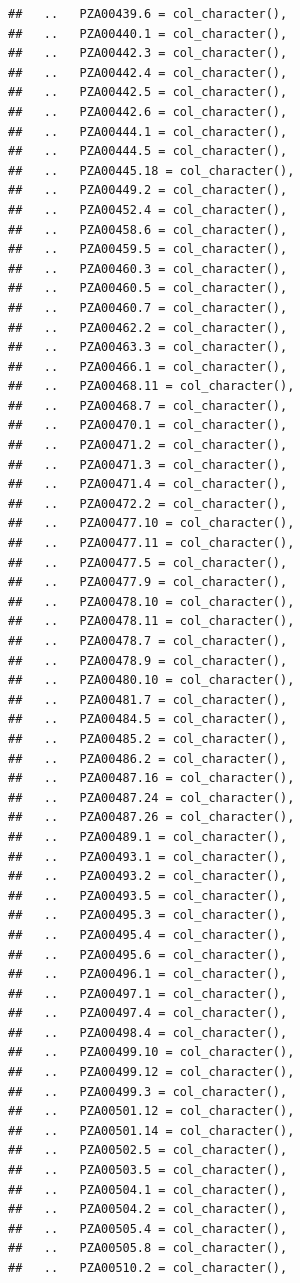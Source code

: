 \documentclass[
]{article}
\begin{document}
\begin{verbatim}
##   ..   PZA00439.6 = col_character(),
##   ..   PZA00440.1 = col_character(),
##   ..   PZA00442.3 = col_character(),
##   ..   PZA00442.4 = col_character(),
##   ..   PZA00442.5 = col_character(),
##   ..   PZA00442.6 = col_character(),
##   ..   PZA00444.1 = col_character(),
##   ..   PZA00444.5 = col_character(),
##   ..   PZA00445.18 = col_character(),
##   ..   PZA00449.2 = col_character(),
##   ..   PZA00452.4 = col_character(),
##   ..   PZA00458.6 = col_character(),
##   ..   PZA00459.5 = col_character(),
##   ..   PZA00460.3 = col_character(),
##   ..   PZA00460.5 = col_character(),
##   ..   PZA00460.7 = col_character(),
##   ..   PZA00462.2 = col_character(),
##   ..   PZA00463.3 = col_character(),
##   ..   PZA00466.1 = col_character(),
##   ..   PZA00468.11 = col_character(),
##   ..   PZA00468.7 = col_character(),
##   ..   PZA00470.1 = col_character(),
##   ..   PZA00471.2 = col_character(),
##   ..   PZA00471.3 = col_character(),
##   ..   PZA00471.4 = col_character(),
##   ..   PZA00472.2 = col_character(),
##   ..   PZA00477.10 = col_character(),
##   ..   PZA00477.11 = col_character(),
##   ..   PZA00477.5 = col_character(),
##   ..   PZA00477.9 = col_character(),
##   ..   PZA00478.10 = col_character(),
##   ..   PZA00478.11 = col_character(),
##   ..   PZA00478.7 = col_character(),
##   ..   PZA00478.9 = col_character(),
##   ..   PZA00480.10 = col_character(),
##   ..   PZA00481.7 = col_character(),
##   ..   PZA00484.5 = col_character(),
##   ..   PZA00485.2 = col_character(),
##   ..   PZA00486.2 = col_character(),
##   ..   PZA00487.16 = col_character(),
##   ..   PZA00487.24 = col_character(),
##   ..   PZA00487.26 = col_character(),
##   ..   PZA00489.1 = col_character(),
##   ..   PZA00493.1 = col_character(),
##   ..   PZA00493.2 = col_character(),
##   ..   PZA00493.5 = col_character(),
##   ..   PZA00495.3 = col_character(),
##   ..   PZA00495.4 = col_character(),
##   ..   PZA00495.6 = col_character(),
##   ..   PZA00496.1 = col_character(),
##   ..   PZA00497.1 = col_character(),
##   ..   PZA00497.4 = col_character(),
##   ..   PZA00498.4 = col_character(),
##   ..   PZA00499.10 = col_character(),
##   ..   PZA00499.12 = col_character(),
##   ..   PZA00499.3 = col_character(),
##   ..   PZA00501.12 = col_character(),
##   ..   PZA00501.14 = col_character(),
##   ..   PZA00502.5 = col_character(),
##   ..   PZA00503.5 = col_character(),
##   ..   PZA00504.1 = col_character(),
##   ..   PZA00504.2 = col_character(),
##   ..   PZA00505.4 = col_character(),
##   ..   PZA00505.8 = col_character(),
##   ..   PZA00510.2 = col_character(),

\end{verbatim}
\end{document}

